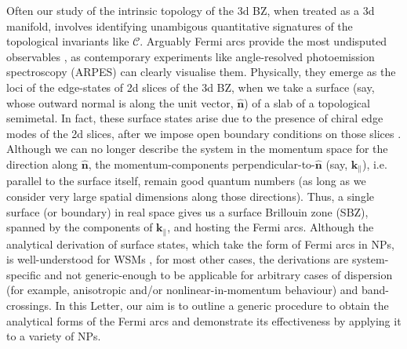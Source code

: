\documentclass[aps,prl,twocolumn,nofootinbib,showkeys, nolongbibliography, 10pt]{revtex4-2}
\begin{document}
Often our study of the intrinsic topology of the 3d BZ, when treated as a 3d manifold, involves identifying unambigous quantitative signatures of the topological invariants like $\mathcal{C}$. Arguably Fermi arcs provide the most undisputed observables \cite{yang_Weyl, lv_Weyl_arc, sanchez, spin1-arc,shroter-arc, Yao2020, multifold-rhsi-arc, quad-weyl-arc}, as contemporary experiments like angle-resolved photoemission spectroscopy (ARPES) can clearly visualise them. Physically, they emerge as the loci of the edge-states of 2d slices of the 3d BZ, when we take a surface (say, whose outward normal is along the unit vector, $\boldsymbol{\hat n}$) of a slab of a  topological semimetal. In fact, these surface states arise due to the presence of chiral edge modes of the 2d slices, after we impose open boundary conditions on those slices \cite{burkov11_Weyl, hosur1, hosur-review}. Although we can no longer describe the system in the momentum space for the direction along $\boldsymbol{\hat n}$, the momentum-components perpendicular-to-$\boldsymbol{\hat n}$ (say, $\mathbf k_\parallel$), i.e. parallel to the surface itself, remain good quantum numbers (as long as we consider very large spatial dimensions along those directions). Thus, a single surface (or boundary) in real space gives us a surface Brillouin zone (SBZ), spanned by the components of $\mathbf k_\parallel$, and hosting the Fermi arcs. Although the analytical derivation of surface states, which take the form of Fermi arcs in NPs, is well-understood for WSMs \cite{witten, hashimoto-arc-weyl, babak-arc-weyl, inti-arc-weyl}, for most other cases, the derivations are system-specific and not generic-enough \cite{witten, okugawa-arc-weyl, liu-arc-mutiweyl, jafari-arc-weyl, trauzettel-arc-weyl, ewelina-surface-states} to be applicable for arbitrary cases of dispersion (for example, anisotropic and/or nonlinear-in-momentum behaviour) and band-crossings. In this Letter, our aim is to outline a generic procedure to obtain the analytical forms of the Fermi arcs and demonstrate its effectiveness by applying it to a variety of NPs.



\end{document}
